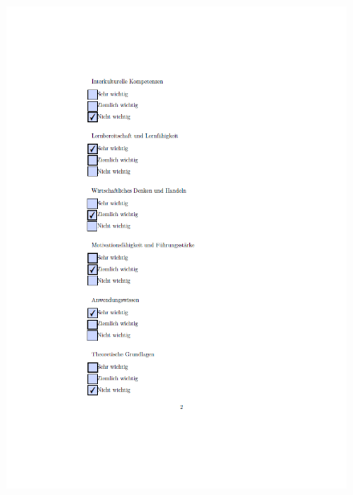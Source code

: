 \begin{figure}[ht]
	\centering
 	\includegraphics[width=1.3\textwidth]{images/Marco2.png}
 	\label{fig:fragmar2}
\end{figure}

